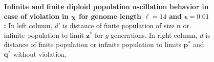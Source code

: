 \begin{figure}[h]
\begin{center}
\hspace{-3em}%
\vspace{-0.5em}  \hspace{-3em}%


\caption[\textbf{Infinite and finite diploid population oscillation behavior in case of violation in $\bm{\chi}$ for genome length $\ell = 14$ and $\bm{\epsilon} = 0.01$}]{\textbf{Infinite and finite diploid population oscillation behavior in case of violation in $\bm{\chi}$ for genome length $\ell = 14$ and $\bm{\epsilon} = 0.01$:} 
  In left column, $d'$ is distance of finite population of size $n$ or infinite population to limit $\bm{z}^\ast$ for $g$ generations. In right column, $d$ is distance of finite population or infinite population to limits $\bm{p}^\ast$ and $\bm{q}^\ast$ without violation.}
\label{oscillation_14d_vio_chi_0.01}
\end{center}
\end{figure}

